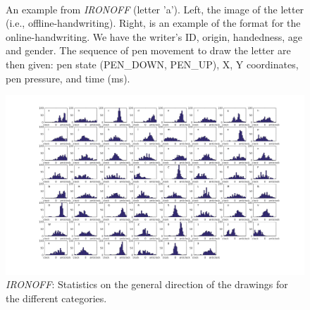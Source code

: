 \begin{figure}[!htbp]
\begin{subfigure}{0.45\textwidth}
    \end{subfigure}
    ~
    \caption{An example from \textit{IRONOFF} (letter 'a'). Left, the image of the letter (i.e., offline-handwriting). Right, is an example of the format for the online-handwriting. We have the writer's ID, origin, handedness, age and gender. The sequence of pen movement to draw the letter are then given: pen state (PEN\_DOWN, PEN\_UP), X, Y coordinates, pen pressure, and time (ms).}
    \label{fig:ironoff_example}
\end{figure}


\begin{figure}
  \centering
  \includegraphics[width=1.2\textwidth, height=\textheight]{images/dataset/ironoff_rond.png}
  \caption{\footnotesize{\textit{IRONOFF}: Statistics on the general direction of the drawings for the different categories.}}
  \label{fig:ironoff_rond}
\end{figure}

